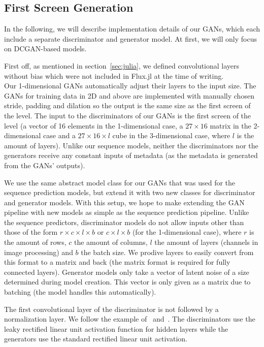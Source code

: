 \subsection{First Screen Generation}
\label{sec:first-screen-generation}


In the following, we will describe implementation details of our GANs,
which each include a separate discriminator and generator model.
At first, we will only focus on DCGAN-based models.

First off, as mentioned in section~\ref{sec:julia}, we defined
convolutional layers without bias which were not included in Flux.jl
at the time of writing. \\
Our 1-dimensional GANs automatically adjust their layers to the input
size. The GANs for training data in 2D and above are implemented with
manually chosen stride, padding and dilation so the output is the same
size as the first screen of the level. The input to the discriminators
of our GANs is the first screen of the level (a vector of 16 elements
in the 1-dimensional case, a $27 \times 16$ matrix in the
2-dimensional case and a $27 \times 16 \times l$ cube in the
3-dimensional case, where $l$ is the amount of layers). Unlike our
sequence models, neither the discriminators nor the generators receive
any constant inputs of metadata (as the metadata is generated from the
GANs' outputs).

We use the same abstract model class for our GANs that was used for
the sequence prediction models, but extend it with two new classes for
discriminator and generator models. With this setup, we hope to make
extending the GAN pipeline with new models as simple as the sequence
prediction pipeline. Unlike the sequence predictors, discriminator
models do not allow inputs other than those of the form
$r \times c \times l \times b$ or $c \times l \times b$ (for the
1-dimensional case), where $r$ is the amount of rows, $c$ the amount
of columns, $l$ the amount of layers (channels in image processing)
and $b$ the batch size. We prodive layers to easily convert from this
format to a matrix and back (the matrix format is required for fully
connected layers). Generator models only take a vector of latent noise
of a size determined during model creation. This vector is only given
as a matrix due to batching (the model handles this automatically).

The first convolutional layer of the discriminator is not followed by
a normalization layer. We follow the example
of~\cite{PytorchExamples2019}
and~\cite{martinarjovskyMartinarjovskyWassersteinGAN2019}. The
discriminators use the leaky rectified linear unit activation function
for hidden layers while the generators use the standard rectified
linear unit activation.

